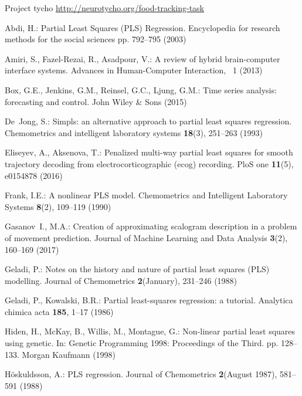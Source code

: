 \documentclass[runningheads]{llncs}
\begin{document}
\begin{thebibliography}{8}

Project tycho
\url{http://neurotycho.org/food-tracking-task}

Abdi, H.: {Partial Least Squares (PLS) Regression}. Encyclopedia for research
  methods for the social sciences pp. 792--795 (2003)

Amiri, S., Fazel-Rezai, R., Asadpour, V.: A review of hybrid brain-computer
  interface systems. Advances in Human-Computer Interaction, ~1
  (2013)

Box, G.E., Jenkins, G.M., Reinsel, G.C., Ljung, G.M.: Time series analysis:
  forecasting and control. John Wiley \& Sons (2015)

De~Jong, S.: Simpls: an alternative approach to partial least squares
  regression. Chemometrics and intelligent laboratory systems  \textbf{18}(3),
  251--263 (1993)

Eliseyev, A., Aksenova, T.: Penalized multi-way partial least squares for
  smooth trajectory decoding from electrocorticographic (ecog) recording. PloS
  one  \textbf{11}(5),  e0154878 (2016)

Frank, I.E.: {A nonlinear PLS model}. Chemometrics and Intelligent Laboratory
  Systems  \textbf{8}(2),  109--119 (1990)

Gasanov~I., M.A.: Creation of approximating scalogram description in a problem
  of movement prediction. Journal of Machine Learning and Data Analysis
  \textbf{3}(2),  160--169 (2017)

Geladi, P.: {Notes on the history and nature of partial least squares (PLS)
  modelling}. Journal of Chemometrics  \textbf{2}(January),  231--246 (1988)

Geladi, P., Kowalski, B.R.: Partial least-squares regression: a tutorial.
  Analytica chimica acta  \textbf{185},  1--17 (1986)

Hiden, H., McKay, B., Willis, M., Montague, G.: Non-linear partial least
  squares using genetic. In: Genetic Programming 1998: Proceedings of the
  Third. pp. 128--133. Morgan Kaufmann (1998)

H{\"{o}}skuldsson, A.: {PLS regression.} Journal of Chemometrics
  \textbf{2}(August 1987),  581--591 (1988)


\end{thebibliography}
\end{document}
